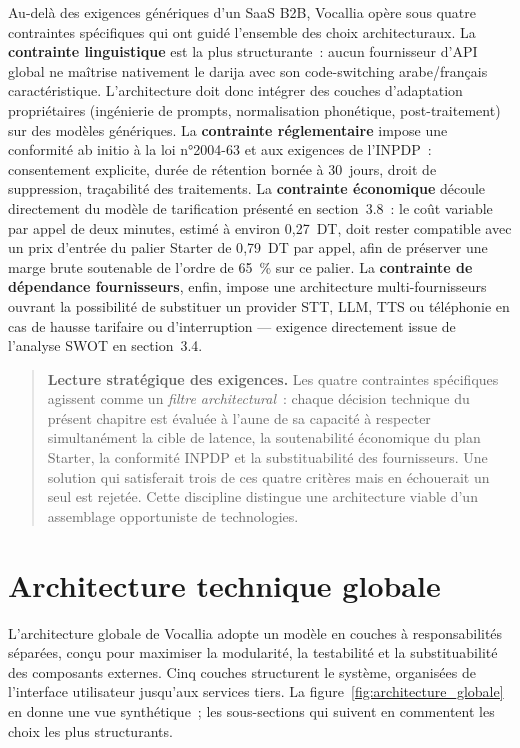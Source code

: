 Au-delà des exigences génériques d'un SaaS B2B, Vocallia opère sous quatre contraintes spécifiques qui ont guidé l'ensemble des choix architecturaux. La \textbf{contrainte linguistique} est la plus structurante~: aucun fournisseur d'API global ne maîtrise nativement le darija avec son code-switching arabe/français caractéristique. L'architecture doit donc intégrer des couches d'adaptation propriétaires (ingénierie de prompts, normalisation phonétique, post-traitement) sur des modèles génériques. La \textbf{contrainte réglementaire} impose une conformité ab initio à la loi n°2004-63 et aux exigences de l'INPDP~: consentement explicite, durée de rétention bornée à 30~jours, droit de suppression, traçabilité des traitements. La \textbf{contrainte économique} découle directement du modèle de tarification présenté en section~3.8~: le coût variable par appel de deux minutes, estimé à environ 0{,}27~DT, doit rester compatible avec un prix d'entrée du palier Starter de 0{,}79~DT par appel, afin de préserver une marge brute soutenable de l'ordre de 65~\% sur ce palier. La \textbf{contrainte de dépendance fournisseurs}, enfin, impose une architecture multi-fournisseurs ouvrant la possibilité de substituer un provider STT, LLM, TTS ou téléphonie en cas de hausse tarifaire ou d'interruption — exigence directement issue de l'analyse SWOT en section~3.4.

\begin{quote}
\textbf{Lecture stratégique des exigences.} Les quatre contraintes spécifiques agissent comme un \emph{filtre architectural}~: chaque décision technique du présent chapitre est évaluée à l'aune de sa capacité à respecter simultanément la cible de latence, la soutenabilité économique du plan Starter, la conformité INPDP et la substituabilité des fournisseurs. Une solution qui satisferait trois de ces quatre critères mais en échouerait un seul est rejetée. Cette discipline distingue une architecture viable d'un assemblage opportuniste de technologies.
\end{quote}

\section{Architecture technique globale}
\label{sec:architecture_globale}

L'architecture globale de Vocallia adopte un modèle en couches à responsabilités séparées, conçu pour maximiser la modularité, la testabilité et la substituabilité des composants externes. Cinq couches structurent le système, organisées de l'interface utilisateur jusqu'aux services tiers. La figure~\ref{fig:architecture_globale} en donne une vue synthétique~; les sous-sections qui suivent en commentent les choix les plus structurants.

